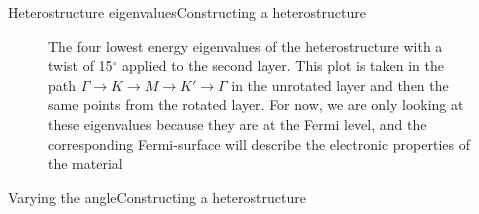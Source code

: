 \documentclass[9pt]{beamer}
\begin{document}
\begin{frame}{Heterostructure eigenvalues}{Constructing a heterostructure}
  \begin{figure}
    \centering
    \caption{The four lowest energy eigenvalues of the heterostructure with a twist of 15$^\circ$ applied to the second layer. This plot is taken in the path $\Gamma \rightarrow K \rightarrow M \rightarrow K' \rightarrow \Gamma$ in the unrotated layer and then the same points from the rotated layer. For now, we are only looking at these eigenvalues because they are at the Fermi level, and the corresponding Fermi-surface will describe the electronic properties of the material}
  \end{figure}
\end{frame}

\begin{frame}{Varying the angle}{Constructing a heterostructure}
\end{frame}
\end{document}

